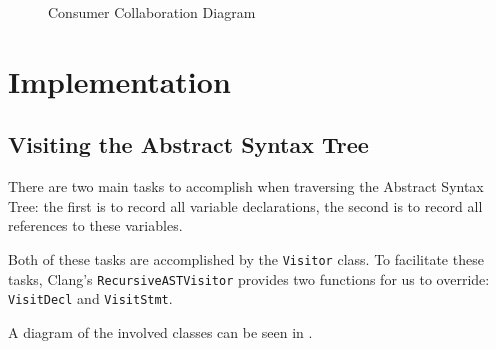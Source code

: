 \begin{figure}[h]
	\label{fig:Consumer}
	\caption{Consumer Collaboration Diagram}
	\centering
\end{figure}

\section{Implementation}
\subsection{Visiting the Abstract Syntax Tree}

There are two main tasks to accomplish when traversing the Abstract Syntax Tree:
the first is to record all variable declarations, the second is to record all
references to these variables.

Both of these tasks are accomplished by the \lstinline|Visitor| class.
To facilitate these tasks, Clang's \lstinline|RecursiveASTVisitor| provides two
functions for us to override: \lstinline|VisitDecl| and \lstinline|VisitStmt|.

A diagram of the involved classes can be seen in .

